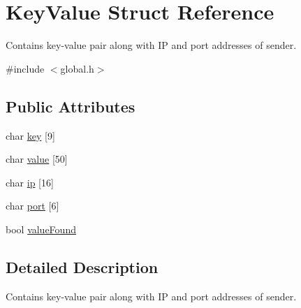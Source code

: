 \hypertarget{structKeyValue}{\section{Key\-Value Struct Reference}
\label{structKeyValue}
}


Contains key-\/value pair along with I\-P and port addresses of sender.  




{\ttfamily \#include $<$global.\-h$>$}

\subsection*{Public Attributes}
\begin{DoxyCompactItemize}
\item 
char \hyperlink{structKeyValue_ad568ca57153492fd17469a5da9c53bf7}{key} \mbox{[}9\mbox{]}
\item 
char \hyperlink{structKeyValue_aecdacf280bd6aaba9bde2ab8be9bc8d6}{value} \mbox{[}50\mbox{]}
\item 
char \hyperlink{structKeyValue_a925635eab00a78fd446a3c55c309b7f3}{ip} \mbox{[}16\mbox{]}
\item 
char \hyperlink{structKeyValue_a888b790a99542bbeaa2533adb59bf1ae}{port} \mbox{[}6\mbox{]}
\item 
bool \hyperlink{structKeyValue_afbdc219b834bb70070e683b96e80a7d4}{value\-Found}
\end{DoxyCompactItemize}


\subsection{Detailed Description}
Contains key-\/value pair along with I\-P and port addresses of sender. 

